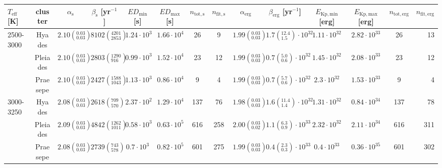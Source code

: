 \begin{tabular}{lccccccccccccr}
\hline\hline
 $T_\mathrm{eff}$ [K] & cluster &            $\alpha_\mathrm{s}$ &     $\beta_\mathrm{s}$ [yr$^{-1}$] & $ED_\mathrm{min}$ [s] & $ED_\mathrm{max}$ [s] & $n_\mathrm{tot,s}$ & $n_\mathrm{fit,s}$ &              $\alpha_\mathrm{erg}$ &              $\beta_\mathrm{erg}$ [yr$^{-1}$] & $E_\mathrm{Kp,min}$ [erg] & $E_\mathrm{Kp,max}$ [erg] & $n_\mathrm{tot,erg}$ & $n_\mathrm{fit,erg}$ \\
\hline
2500-3000 & Hyades &  $2.10\left(^{0.03}_{0.03}\right)$ &  $8102\left(^{4201}_{2853}\right)$ &    $1.24\cdot 10^{3}$ &    $1.66\cdot 10^{4}$ &                 26 &                  9 &  $1.99\left(^{0.03}_{0.03}\right)$ &  $1.7\left(^{12.4}_{1.5}\right)\cdot 10^{32}$ &       $1.11\cdot 10^{32}$ &       $2.82\cdot 10^{33}$ &                   26 &                   13 \\
          & Pleiades &  $2.10\left(^{0.03}_{0.03}\right)$ &   $2803\left(^{1290}_{916}\right)$ &    $0.99\cdot 10^{3}$ &    $1.52\cdot 10^{4}$ &                 23 &                 12 &  $1.99\left(^{0.03}_{0.03}\right)$ &   $0.7\left(^{5.0}_{0.6}\right)\cdot 10^{32}$ &       $1.45\cdot 10^{32}$ &       $2.08\cdot 10^{33}$ &                   23 &                   12 \\
          & Praesepe &  $2.10\left(^{0.03}_{0.03}\right)$ &  $2427\left(^{1588}_{1043}\right)$ &    $1.13\cdot 10^{3}$ &    $0.86\cdot 10^{4}$ &                  9 &                  4 &  $1.99\left(^{0.03}_{0.03}\right)$ &   $0.7\left(^{5.7}_{0.6}\right)\cdot 10^{32}$ &        $2.3\cdot 10^{32}$ &       $1.53\cdot 10^{33}$ &                    9 &                    4 \\
3000-3250 & Hyades &  $2.08\left(^{0.03}_{0.03}\right)$ &    $2618\left(^{709}_{570}\right)$ &    $2.37\cdot 10^{2}$ &    $1.29\cdot 10^{4}$ &                137 &                 76 &  $1.98\left(^{0.03}_{0.03}\right)$ &  $1.6\left(^{11.4}_{1.4}\right)\cdot 10^{32}$ &       $1.31\cdot 10^{32}$ &       $0.84\cdot 10^{34}$ &                  137 &                   78 \\
          & Pleiades &  $2.09\left(^{0.03}_{0.03}\right)$ &  $4842\left(^{1262}_{1011}\right)$ &    $0.58\cdot 10^{3}$ &    $0.63\cdot 10^{5}$ &                616 &                258 &  $2.00\left(^{0.03}_{0.02}\right)$ &   $1.1\left(^{6.3}_{0.9}\right)\cdot 10^{33}$ &       $2.32\cdot 10^{32}$ &       $2.11\cdot 10^{34}$ &                  616 &                  311 \\
          & Praesepe &  $2.08\left(^{0.03}_{0.03}\right)$ &    $2739\left(^{743}_{578}\right)$ &     $0.7\cdot 10^{3}$ &    $0.82\cdot 10^{5}$ &                601 &                275 &  $1.99\left(^{0.03}_{0.03}\right)$ &   $0.4\left(^{2.3}_{0.3}\right)\cdot 10^{33}$ &        $0.4\cdot 10^{33}$ &       $0.36\cdot 10^{35}$ &                  601 &                  302 \\

\end{tabular}
